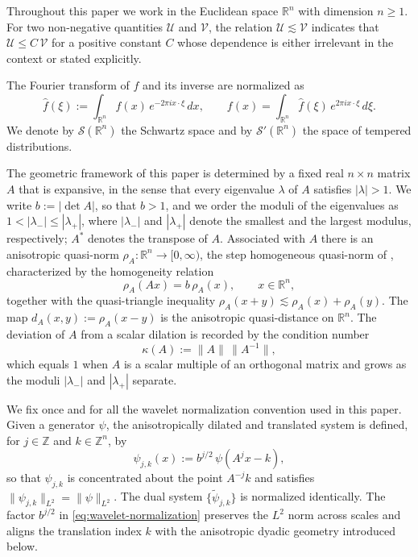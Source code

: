 \documentclass[pdflatex,sn-basic,Numbered]{sn-jnl}
\theoremstyle{thmstyleone}%
\theoremstyle{thmstylethree}%
\begin{document}
Throughout this paper we work in the Euclidean space $\mathbb{R}^n$ with
dimension $n \ge 1$. For two non-negative quantities $\mathcal{U}$ and
$\mathcal{V}$, the relation $\mathcal{U} \lesssim \mathcal{V}$ indicates that
$\mathcal{U} \le C\,\mathcal{V}$ for a positive constant $C$ whose dependence is
either irrelevant in the context or stated explicitly.

The Fourier transform of $f$ and its inverse are normalized as
\begin{equation*}
	\hat{f}(\xi) := \int_{\mathbb{R}^n} f(x)\, e^{-2\pi i x \cdot \xi}\, dx,
	\qquad
	f(x) = \int_{\mathbb{R}^n} \hat{f}(\xi)\, e^{2\pi i x \cdot \xi}\, d\xi.
\end{equation*}
We denote by $\mathcal{S}(\mathbb{R}^n)$ the Schwartz space and by
$\mathcal{S}'(\mathbb{R}^n)$ the space of tempered distributions.

The geometric framework of this paper is determined by a fixed real $n \times
n$ matrix $A$ that is expansive, in the sense that every eigenvalue $\lambda$ of
$A$ satisfies $|\lambda| > 1$. We write $b := |\det A|$, so that $b > 1$, and we
order the moduli of the eigenvalues as $1 < |\lambda_-| \le |\lambda_+|$, where
$|\lambda_-|$ and $|\lambda_+|$ denote the smallest and the largest modulus,
respectively; $A^{*}$ denotes the transpose of $A$. Associated with $A$ there is
an anisotropic quasi-norm $\rho_A \colon \mathbb{R}^n \to [0,\infty)$, the step
homogeneous quasi-norm of \cite{Bownik2003}, characterized by the homogeneity
relation
\begin{equation}\label{eq:rho-homogeneity}
	\rho_A(Ax) = b\,\rho_A(x), \qquad x \in \mathbb{R}^n,
\end{equation}
together with the quasi-triangle inequality $\rho_A(x+y) \lesssim \rho_A(x) +
\rho_A(y)$. The map $d_A(x,y) := \rho_A(x-y)$ is the anisotropic quasi-distance
on $\mathbb{R}^n$. The deviation of $A$ from a scalar dilation is recorded by
the condition number
\begin{equation}\label{eq:condition-number}
	\kappa(A) := \|A\|\,\|A^{-1}\|,
\end{equation}
which equals $1$ when $A$ is a scalar multiple of an orthogonal matrix and
grows as the moduli $|\lambda_-|$ and $|\lambda_+|$ separate.

We fix once and for all the wavelet normalization convention used in this
paper. Given a generator $\psi$, the anisotropically dilated and translated
system is defined, for $j \in \mathbb{Z}$ and $k \in \mathbb{Z}^n$, by
\begin{equation}\label{eq:wavelet-normalization}
	\psi_{j,k}(x) := b^{j/2}\, \psi\!\left(A^j x - k\right),
\end{equation}
so that $\psi_{j,k}$ is concentrated about the point $A^{-j}k$ and satisfies
$\|\psi_{j,k}\|_{L^2} = \|\psi\|_{L^2}$. The dual system $\{\tilde{\psi}_{j,k}\}$
is normalized identically. The factor $b^{j/2}$ in
\eqref{eq:wavelet-normalization} preserves the $L^2$ norm across scales and
aligns the translation index $k$ with the anisotropic dyadic geometry
introduced below.
\end{document}
